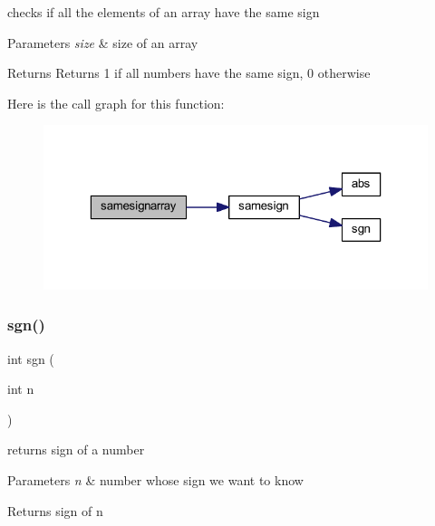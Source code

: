 checks if all the elements of an array have the same sign 


\begin{DoxyParams}{Parameters}
{\em size} & size of an array \\
\hline
\end{DoxyParams}
\begin{DoxyReturn}{Returns}
Returns 1 if all numbers have the same sign, 0 otherwise 
\end{DoxyReturn}
Here is the call graph for this function\+:\nopagebreak
\begin{figure}[H]
\begin{center}
\leavevmode
\includegraphics[width=323pt]{group__utilities_ga75e5e4e3c99b54b12f0bb43becded2d1_cgraph}
\end{center}
\end{figure}
\hypertarget{group__utilities_ga67452a3b663c47b61edb379f159ae478}{}\label{group__utilities_ga67452a3b663c47b61edb379f159ae478} 
\subsubsection{\texorpdfstring{sgn()}{sgn()}}
{\footnotesize\ttfamily int sgn (\begin{DoxyParamCaption}\item[{int}]{n }\end{DoxyParamCaption})}



returns sign of a number 


\begin{DoxyParams}{Parameters}
{\em n} & number whose sign we want to know \\
\hline
\end{DoxyParams}
\begin{DoxyReturn}{Returns}
sign of n 
\end{DoxyReturn}
\hypertarget{group__utilities_ga971bb40926a0f370263e085d1e2ac690}{}\label{group__utilities_ga971bb40926a0f370263e085d1e2ac690} 
